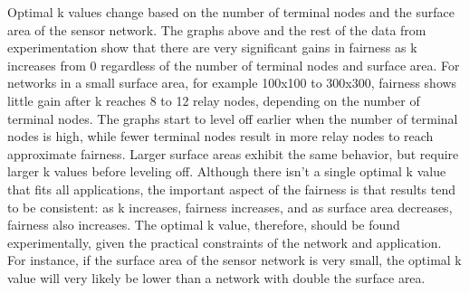 Optimal k values change based on the number of terminal nodes and the surface area of the sensor network.  The graphs above and the rest of the data from experimentation show that there are very significant gains in fairness as k increases from 0 regardless of the number of terminal nodes and surface area.   For networks in a small surface area, for example 100x100 to 300x300, fairness shows little gain after k reaches 8 to 12 relay nodes, depending on the number of terminal nodes.  The graphs start to level off earlier when the number of terminal nodes is high, while fewer terminal nodes result in more relay nodes to reach approximate fairness.  Larger surface areas exhibit the same behavior, but require larger k values before leveling off.  Although there isn't a single optimal k value that fits all applications, the important aspect of the fairness is that results tend to be consistent: as k increases, fairness increases, and as surface area decreases, fairness also increases.
The optimal k value, therefore, should be found experimentally, given the practical constraints of the network and application.  For instance, if the surface area of the sensor network is very small, the optimal k value will very likely be lower than a network with double the surface area.
